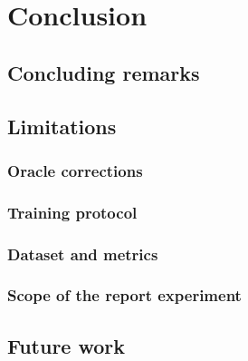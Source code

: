 \chapter{Conclusion}
\label{ch:conclusion}


\section{Concluding remarks}

\section{Limitations}
\subsection{Oracle corrections}
\subsection{Training protocol}
\subsection{Dataset and metrics}
\subsection{Scope of the report experiment}

\section{Future work}
